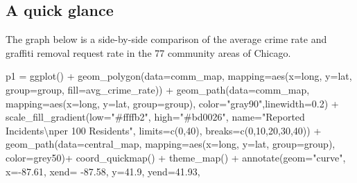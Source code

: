 \documentclass[
]{report}
\newenvironment{Shaded}{}{}
\newcommand{\AttributeTok}[1]{\textcolor[rgb]{0.65,0.15,0.64}{#1}}
\newcommand{\DecValTok}[1]{\textcolor[rgb]{0.60,0.41,0.00}{#1}}
\newcommand{\FloatTok}[1]{\textcolor[rgb]{0.60,0.41,0.00}{#1}}
\newcommand{\FunctionTok}[1]{\textcolor[rgb]{0.25,0.47,0.95}{#1}}
\newcommand{\NormalTok}[1]{\textcolor[rgb]{0.22,0.23,0.26}{#1}}
\newcommand{\OtherTok}[1]{\textcolor[rgb]{0.15,0.68,0.38}{#1}}
\newcommand{\SpecialCharTok}[1]{\textcolor[rgb]{0.00,0.52,0.74}{#1}}
\newcommand{\StringTok}[1]{\textcolor[rgb]{0.31,0.63,0.31}{#1}}
\begin{document}
\hypertarget{a-quick-glance}{%
\subsection{A quick glance}\label{a-quick-glance}}

The graph below is a side-by-side comparison of the average crime rate
and graffiti removal request rate in the 77 community areas of Chicago.

\begin{Shaded}
\begin{Highlighting}[]
\NormalTok{p1 }\OtherTok{=} \FunctionTok{ggplot}\NormalTok{() }\SpecialCharTok{+}
  \FunctionTok{geom\_polygon}\NormalTok{(}\AttributeTok{data=}\NormalTok{comm\_map, }\AttributeTok{mapping=}\FunctionTok{aes}\NormalTok{(}\AttributeTok{x=}\NormalTok{long, }\AttributeTok{y=}\NormalTok{lat, }\AttributeTok{group=}\NormalTok{group, }\AttributeTok{fill=}\NormalTok{avg\_crime\_rate)) }\SpecialCharTok{+}
  \FunctionTok{geom\_path}\NormalTok{(}\AttributeTok{data=}\NormalTok{comm\_map, }\AttributeTok{mapping=}\FunctionTok{aes}\NormalTok{(}\AttributeTok{x=}\NormalTok{long, }\AttributeTok{y=}\NormalTok{lat, }\AttributeTok{group=}\NormalTok{group), }\AttributeTok{color=}\StringTok{"gray90"}\NormalTok{,}\AttributeTok{linewidth=}\FloatTok{0.2}\NormalTok{) }\SpecialCharTok{+}
  \FunctionTok{scale\_fill\_gradient}\NormalTok{(}\AttributeTok{low=}\StringTok{"\#ffffb2"}\NormalTok{, }\AttributeTok{high=}\StringTok{"\#bd0026"}\NormalTok{,}
                      \AttributeTok{name=}\StringTok{"Reported Incidents}\SpecialCharTok{\textbackslash{}n}\StringTok{per 100 Residents"}\NormalTok{,}
                      \AttributeTok{limits=}\FunctionTok{c}\NormalTok{(}\DecValTok{0}\NormalTok{,}\DecValTok{40}\NormalTok{),}
                      \AttributeTok{breaks=}\FunctionTok{c}\NormalTok{(}\DecValTok{0}\NormalTok{,}\DecValTok{10}\NormalTok{,}\DecValTok{20}\NormalTok{,}\DecValTok{30}\NormalTok{,}\DecValTok{40}\NormalTok{)) }\SpecialCharTok{+}
  \FunctionTok{geom\_path}\NormalTok{(}\AttributeTok{data=}\NormalTok{central\_map, }\AttributeTok{mapping=}\FunctionTok{aes}\NormalTok{(}\AttributeTok{x=}\NormalTok{long, }\AttributeTok{y=}\NormalTok{lat, }\AttributeTok{group=}\NormalTok{group), }\AttributeTok{color=}\StringTok{\textquotesingle{}grey50\textquotesingle{}}\NormalTok{)}\SpecialCharTok{+}
  \FunctionTok{coord\_quickmap}\NormalTok{() }\SpecialCharTok{+}
  \FunctionTok{theme\_map}\NormalTok{() }\SpecialCharTok{+}
  \FunctionTok{annotate}\NormalTok{(}\AttributeTok{geom=}\StringTok{"curve"}\NormalTok{, }\AttributeTok{x=}\SpecialCharTok{{-}}\FloatTok{87.61}\NormalTok{, }\AttributeTok{xend=} \SpecialCharTok{{-}}\FloatTok{87.58}\NormalTok{, }\AttributeTok{y=}\FloatTok{41.9}\NormalTok{, }\AttributeTok{yend=}\FloatTok{41.93}\NormalTok{,}

\end{Highlighting}
\end{Shaded}
\end{document}
